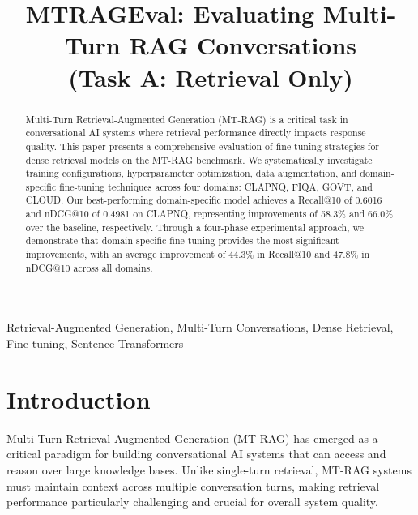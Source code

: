 \documentclass[conference]{IEEEtran}
\begin{document}
\title{MTRAGEval: Evaluating Multi-Turn RAG Conversations\\
(Task A: Retrieval Only)}

\author{
\and
{}
\and
{}
}

\maketitle

\begin{abstract}
Multi-Turn Retrieval-Augmented Generation (MT-RAG) is a critical task in conversational AI systems where retrieval performance directly impacts response quality. This paper presents a comprehensive evaluation of fine-tuning strategies for dense retrieval models on the MT-RAG benchmark. We systematically investigate training configurations, hyperparameter optimization, data augmentation, and domain-specific fine-tuning techniques across four domains: CLAPNQ, FIQA, GOVT, and CLOUD. Our best-performing domain-specific model achieves a Recall@10 of 0.6016 and nDCG@10 of 0.4981 on CLAPNQ, representing improvements of 58.3\% and 66.0\% over the baseline, respectively. Through a four-phase experimental approach, we demonstrate that domain-specific fine-tuning provides the most significant improvements, with an average improvement of 44.3\% in Recall@10 and 47.8\% in nDCG@10 across all domains.
\end{abstract}

\begin{IEEEkeywords}
Retrieval-Augmented Generation, Multi-Turn Conversations, Dense Retrieval, Fine-tuning, Sentence Transformers
\end{IEEEkeywords}

\section{Introduction}

Multi-Turn Retrieval-Augmented Generation (MT-RAG) has emerged as a critical paradigm for building conversational AI systems that can access and reason over large knowledge bases. Unlike single-turn retrieval, MT-RAG systems must maintain context across multiple conversation turns, making retrieval performance particularly challenging and crucial for overall system quality.
\end{document}

